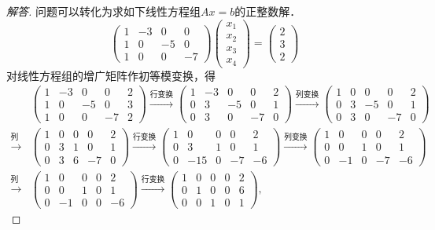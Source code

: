 \documentclass[a4paper,fontset=windows]{ctexbook}
\theoremstyle{definition}
\begin{document}
\begin{proof}[解答]
问题可以转化为求如下线性方程组$Ax=b$的正整数解．
$$\begin{pmatrix}1&-3&0&0 \\ 1&0&-5&0 \\ 1&0&0&-7\end{pmatrix}\begin{pmatrix}x_1 \\ x_2 \\ x_3 \\ x_4\end{pmatrix}=\begin{pmatrix}2 \\ 3 \\ 2\end{pmatrix}$$
对线性方程组的增广矩阵作初等模变换，得
\begin{align*}
&\begin{pmatrix}1&-3&0&0&2 \\ 1&0&-5&0&3 \\ 1&0&0&-7&2\end{pmatrix}\xrightarrow{\text{行变换}}\begin{pmatrix}1&-3&0&0&2 \\ 0&3&-5&0&1 \\ 0&3&0&-7&0\end{pmatrix}\xrightarrow{\text{列变换}}\begin{pmatrix}1&0&0&0&2 \\ 0&3&-5&0&1 \\ 0&3&0&-7&0\end{pmatrix} \\
\xrightarrow{\text{列变换}}&\begin{pmatrix}1&0&0&0&2 \\ 0&3&1&0&1 \\ 0&3&6&-7&0\end{pmatrix}\xrightarrow{\text{行变换}}\begin{pmatrix}1&0&0&0&2 \\ 0&3&1&0&1 \\ 0&-15&0&-7&-6\end{pmatrix}\xrightarrow{\text{列变换}}\begin{pmatrix}1&0&0&0&2 \\ 0&0&1&0&1 \\ 0&-1&0&-7&-6\end{pmatrix} \\
\xrightarrow{\text{列变换}}&\begin{pmatrix}1&0&0&0&2 \\ 0&0&1&0&1 \\ 0&-1&0&0&-6\end{pmatrix}\xrightarrow{\text{行变换}}\begin{pmatrix}1&0&0&0&2 \\ 0&1&0&0&6 \\ 0&0&1&0&1\end{pmatrix},

\end{align*}
\end{proof}
\end{document}
